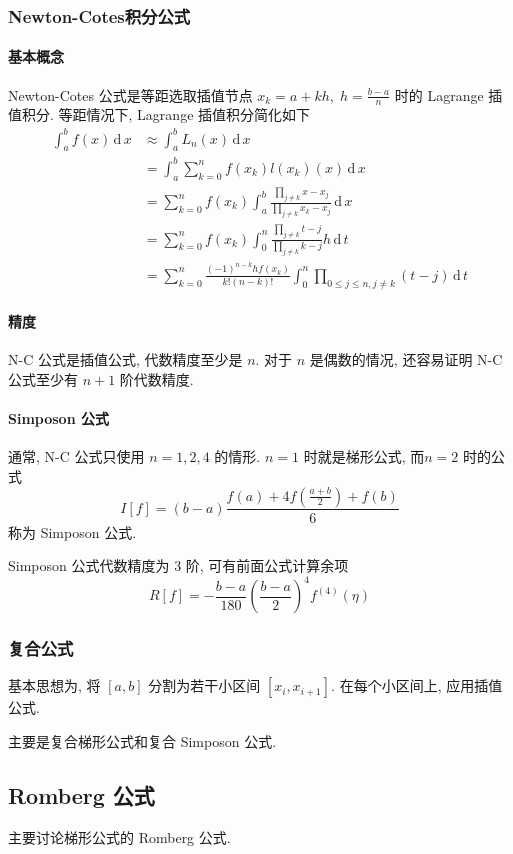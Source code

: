 \documentclass{ctexart}
\newcommand{\ud}{\,\mathrm{d}\,}
\begin{document}
\subsubsection{Newton-Cotes积分公式}
\paragraph{基本概念}
    Newton-Cotes 公式是等距选取插值节点 $x_k = a + kh,\;h = \frac{b-a}{n}$ 时的
    Lagrange 插值积分. 等距情况下, Lagrange 插值积分简化如下
    \begin{align*}
        \int_a^b f(x) \ud x &\approx \int_a^b L_n(x) \ud x\\
            &= \int_a^b \sum_{k=0}^n f(x_k) l(x_k)(x) \ud x\\
            &= \sum_{k=0}^n f(x_k) \int_a^b \frac{\prod_{j \neq k} x - x_j}{\prod_{j \neq k} x_k - x_j} \ud x\\
            &= \sum_{k=0}^n f(x_k) \int_0^n \frac{\prod_{j \neq k} t - j}{\prod_{j \neq k} k - j} h \ud t\\
            &= \sum_{k=0}^n \frac{(-1)^{n-k} h f(x_k)}{k! (n-k)!} \int_0^n \prod_{0\le j\le n, j\neq k} (t-j) \ud t
    \end{align*}
\paragraph{精度}
    N-C 公式是插值公式, 代数精度至少是 $n$.
    对于 $n$ 是偶数的情况, 还容易证明 N-C 公式至少有 $n+1$ 阶代数精度.
    \par
\paragraph{Simposon 公式}
    通常, N-C 公式只使用 $n=1,2,4$ 的情形. 
    $n=1$ 时就是梯形公式, 而$n=2$ 时的公式 \[
        I[f] = (b-a) \frac{f(a) + 4 f\left(\frac{a+b}{2}\right) + f(b) }{6}
        \]
    称为 Simposon 公式.\par
    Simposon 公式代数精度为 3 阶, 可有前面公式计算余项 \[
        R[f] = -\frac{b-a}{180} \left(\frac{b-a}{2}\right)^4 f^{(4)}(\eta)\]
\subsubsection{复合公式}
    基本思想为, 将 $[a,b]$ 分割为若干小区间 $[x_i, x_{i+1}]$.
    在每个小区间上, 应用插值公式.\par
    主要是复合梯形公式和复合 Simposon 公式.

\subsection{Romberg 公式}
    主要讨论梯形公式的 Romberg 公式.
\end{document}
